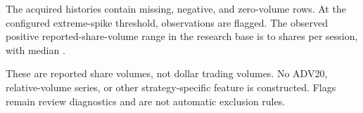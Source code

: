 
The acquired histories contain \MissingVolume{} missing, \NegativeVolume{} negative, and \ZeroVolume{} zero-volume rows. At the configured extreme-spike threshold, \ExtremeVolumeSpikes{} observations are flagged. The observed positive reported-share-volume range in the research base is \VolumeMin{} to \VolumeMax{} shares per session, with median \VolumeMedian{}.

These are reported share volumes, not dollar trading volumes. No ADV20, relative-volume series, or other strategy-specific feature is constructed. Flags remain review diagnostics and are not automatic exclusion rules.
